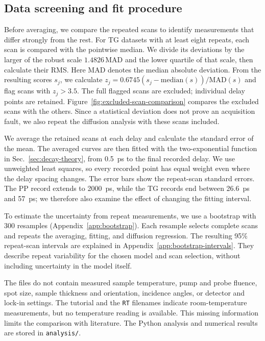 \documentclass[11pt,a4paper]{article}
\begin{document}
\subsection{Data screening and fit procedure}
Before averaging, we compare the repeated scans to identify measurements that differ strongly from the rest. For TG datasets with at least eight repeats, each scan is compared with the pointwise median. We divide its deviations by the larger of the robust scale $1.4826\,\mathrm{MAD}$ and the lower quartile of that scale, then calculate their RMS. Here MAD denotes the median absolute deviation. From the resulting scores $s_j$, we calculate $z_j=0.6745(s_j-\mathrm{median}(s))/\mathrm{MAD}(s)$ and flag scans with $z_j>3.5$. The full flagged scans are excluded; individual delay points are retained. Figure~\ref{fig:excluded-scan-comparison} compares the excluded scans with the others. Since a statistical deviation does not prove an acquisition fault, we also repeat the diffusion analysis with these scans included.

We average the retained scans at each delay and calculate the standard error of the mean. The averaged curves are then fitted with the two-exponential function in Sec.~\ref{sec:decay-theory}, from \SI{0.5}{ps} to the final recorded delay. We use unweighted least squares, so every recorded point has equal weight even where the delay spacing changes. The error bars show the repeat-scan standard errors. The PP record extends to \SI{2000}{ps}, while the TG records end between \SI{26.6}{ps} and \SI{57}{ps}; we therefore also examine the effect of changing the fitting interval.

To estimate the uncertainty from repeat measurements, we use a bootstrap with 300 resamples (Appendix~\ref{app:bootstrap}). Each resample selects complete scans and repeats the averaging, fitting, and diffusion regression. The resulting 95\% repeat-scan intervals are explained in Appendix~\ref{app:bootstrap-intervals}. They describe repeat variability for the chosen model and scan selection, without including uncertainty in the model itself.

The files do not contain measured sample temperature, pump and probe fluence, spot size, sample thickness and orientation, incidence angles, or detector and lock-in settings. The tutorial and the \texttt{RT} filenames indicate room-temperature measurements, but no temperature reading is available. This missing information limits the comparison with literature. The Python analysis and numerical results are stored in \texttt{analysis/}.
\end{document}
